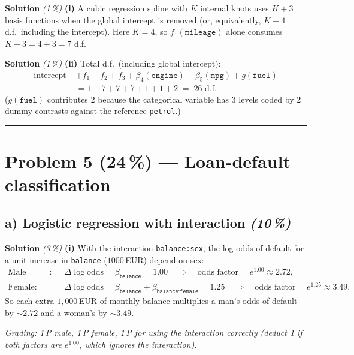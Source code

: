 \documentclass[11pt,a4paper]{article}
\newcommand{\points}[1]{\textbf{(#1\,\%)}}
\newcommand{\subpoints}[1]{\textit{(#1\,\%)}}
\newcommand{\sol}{\noindent\textbf{Solution}}
\begin{document}
\sol{} \subpoints{1} \textbf{(i)} A cubic regression spline with $K$ internal knots uses $K+3$
basis functions when the global intercept is removed (or, equivalently, $K+4$ d.f.\ including the
intercept). Here $K=4$, so $f_1(\texttt{mileage})$ alone consumes
$\boxed{K+3=4+3=7}$ d.f.

\medskip
\sol{} \subpoints{1} \textbf{(ii)} Total d.f.\ (including global intercept):
\begin{align*}
\text{intercept } &+ f_1 + f_2 + f_3 + \beta_4(\texttt{engine}) + \beta_5(\texttt{mpg}) + g(\texttt{fuel}) \\
&= 1 + 7 + 7 + 7 + 1 + 1 + 2 \;=\; \boxed{26} \text{ d.f.}
\end{align*}
($g(\texttt{fuel})$ contributes $2$ because the categorical variable has $3$ levels coded by $2$
dummy contrasts against the reference \texttt{petrol}.)

\vspace{0.6em}
\hrule
\vspace{1em}

\section*{Problem 5 \points{24} --- Loan-default classification}

\subsection*{a) Logistic regression with interaction \subpoints{10}}

\sol{} \subpoints{3} \textbf{(i)} With the interaction \texttt{balance:sex}, the
log-odds of default for a unit increase in \texttt{balance} ($1000$\,EUR) depend on sex:
\begin{align*}
\text{Male (reference)}: &\quad \Delta\log\text{odds} = \beta_{\texttt{balance}} = 1.00
   \quad\Rightarrow\quad \text{odds factor} = e^{1.00} \approx \boxed{2.72}, \\
\text{Female}: &\quad \Delta\log\text{odds} = \beta_{\texttt{balance}} + \beta_{\texttt{balance:female}} = 1.25
   \quad\Rightarrow\quad \text{odds factor} = e^{1.25} \approx \boxed{3.49}.
\end{align*}
So each extra $1{,}000$\,EUR of monthly balance multiplies a man's odds of default by $\sim 2.72$
and a woman's by $\sim 3.49$.

\noindent\emph{Grading: 1\,P male, 1\,P female, 1\,P for using the interaction correctly (deduct
1 if both factors are $e^{1.00}$, which ignores the interaction).}
\end{document}
